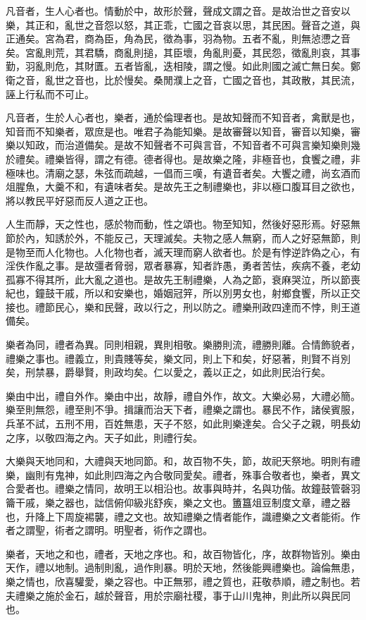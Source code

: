 凡音者，生人心者也。情動於中，故形於聲，聲成文謂之音。是故治世之音安以樂，其正和，亂世之音怨以怒，其正乖，亡國之音哀以思，其民困。聲音之道，與正通矣。宮為君，商為臣，角為民，徵為事，羽為物。五者不亂，則無惉懘之音矣。宮亂則荒，其君驕，商亂則搥，其臣壞，角亂則憂，其民怨，徵亂則哀，其事勤，羽亂則危，其財匱。五者皆亂，迭相陵，謂之慢。如此則國之滅亡無日矣。鄭衛之音，亂世之音也，比於慢矣。桑閒濮上之音，亡國之音也，其政散，其民流，誣上行私而不可止。

凡音者，生於人心者也，樂者，通於倫理者也。是故知聲而不知音者，禽獸是也，知音而不知樂者，眾庶是也。唯君子為能知樂。是故審聲以知音，審音以知樂，審樂以知政，而治道備矣。是故不知聲者不可與言音，不知音者不可與言樂知樂則幾於禮矣。禮樂皆得，謂之有德。德者得也。是故樂之隆，非極音也，食饗之禮，非極味也。清廟之瑟，朱弦而疏越，一倡而三嘆，有遺音者矣。大饗之禮，尚玄酒而俎腥魚，大羹不和，有遺味者矣。是故先王之制禮樂也，非以極口腹耳目之欲也，將以教民平好惡而反人道之正也。

人生而靜，天之性也，感於物而動，性之頌也。物至知知，然後好惡形焉。好惡無節於內，知誘於外，不能反己，天理滅矣。夫物之感人無窮，而人之好惡無節，則是物至而人化物也。人化物也者，滅天理而窮人欲者也。於是有悖逆詐偽之心，有淫佚作亂之事。是故彊者脅弱，眾者暴寡，知者詐愚，勇者苦怯，疾病不養，老幼孤寡不得其所，此大亂之道也。是故先王制禮樂，人為之節，衰麻哭泣，所以節喪紀也，鐘鼓干戚，所以和安樂也，婚姻冠笄，所以別男女也，射鄉食饗，所以正交接也。禮節民心，樂和民聲，政以行之，刑以防之。禮樂刑政四達而不悖，則王道備矣。

樂者為同，禮者為異。同則相親，異則相敬。樂勝則流，禮勝則離。合情飾貌者，禮樂之事也。禮義立，則貴賤等矣，樂文同，則上下和矣，好惡著，則賢不肖別矣，刑禁暴，爵舉賢，則政均矣。仁以愛之，義以正之，如此則民治行矣。

樂由中出，禮自外作。樂由中出，故靜，禮自外作，故文。大樂必易，大禮必簡。樂至則無怨，禮至則不爭。揖讓而治天下者，禮樂之謂也。暴民不作，諸侯賓服，兵革不試，五刑不用，百姓無患，天子不怒，如此則樂達矣。合父子之親，明長幼之序，以敬四海之內。天子如此，則禮行矣。

大樂與天地同和，大禮與天地同節。和，故百物不失，節，故祀天祭地。明則有禮樂，幽則有鬼神，如此則四海之內合敬同愛矣。禮者，殊事合敬者也，樂者，異文合愛者也。禮樂之情同，故明王以相沿也。故事與時并，名與功偕。故鐘鼓管磬羽籥干戚，樂之器也，詘信俯仰級兆舒疾，樂之文也。簠簋俎豆制度文章，禮之器也，升降上下周旋裼襲，禮之文也。故知禮樂之情者能作，識禮樂之文者能術。作者之謂聖，術者之謂明。明聖者，術作之謂也。

樂者，天地之和也，禮者，天地之序也。和，故百物皆化，序，故群物皆別。樂由天作，禮以地制。過制則亂，過作則暴。明於天地，然後能興禮樂也。論倫無患，樂之情也，欣喜驩愛，樂之容也。中正無邪，禮之質也，莊敬恭順，禮之制也。若夫禮樂之施於金石，越於聲音，用於宗廟社稷，事于山川鬼神，則此所以與民同也。


